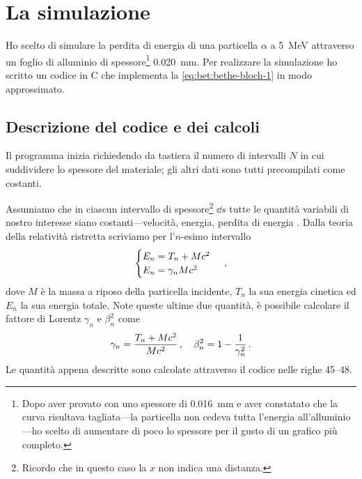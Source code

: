 \section{La simulazione}
    Ho scelto di simulare la perdita di energia di una particella $\alpha$ a \SI{5}{\mega\eV} attraverso un foglio di alluminio di spessore\footnote{Dopo aver provato con uno spessore di \SI{0.016}{\milli\meter} e aver constatato che la curva risultava tagliata---la particella non cedeva tutta l'energia all'alluminio---ho scelto di aumentare di poco lo spessore per il gusto di un grafico più completo.} \SI{0.020}{\milli\meter}. Per realizzare la simulazione ho scritto un codice in C che implementa la \eqref{eq:bet:bethe-bloch-1} in modo approssimato.
    \subsection{Descrizione del codice e dei calcoli}
        Il programma inizia richiedendo da tastiera il numero di intervalli $N$ in cui suddividere lo spessore del materiale; gli altri dati sono tutti precompilati come costanti. 
        
        Assumiamo che in ciascun intervallo di spessore\footnote{Ricordo che in questo caso la $x$ non indica una distanza.} $\dd{s}$ tutte le quantità variabili di nostro interesse siano costanti---velocità, energia, perdita di energia \myetc. Dalla teoria della relatività ristretta scriviamo per l'$n$-esimo intervallo
        \begin{equation*}
            \begin{cases}    
                E_n = T_n + M c^2\\
                E_n = \gamma_n M c^2
            \end{cases}
            \,,
        \end{equation*}
        dove $M$ è la massa a riposo della particella incidente, $T_n$ la sua energia cinetica ed $E_n$ la sua energia totale. Note queste ultime due quantità, è possibile calcolare il fattore di Lorentz $\gamma_n$ e $\beta_n^2$ come
        \begin{equation*}
            \gamma_n = \frac{T_n + M c^2}{M c^2}
            \,,
            \quad
            \beta_n^2 = 1 - \frac{1}{\gamma_n^2}
            \,.
        \end{equation*}
        Le quantità appena descritte sono calcolate attraverso il codice nelle righe 45--48.


